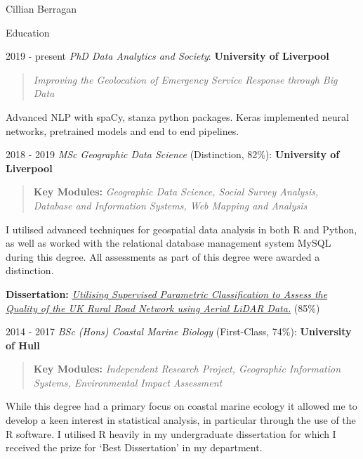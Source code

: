 \documentclass{scrartcl}
\begin{document}
\begin{cv}{Cillian Berragan}
\newpage
\begin{cvlist}{Education}

\item[2019 - present] \normalsize\textit{PhD Data Analytics and Society}: \textbf{University of Liverpool}

    \begin{quote}
        \small \textit{Improving the Geolocation of Emergency Service Response through Big Data}
    \end{quote}

    \small Advanced NLP with spaCy, stanza python packages. Keras implemented neural networks, pretrained models and end to end pipelines.

\item[2018 - 2019] \normalsize\textit{MSc Geographic Data Science} (Distinction, 82\%): \textbf{University of Liverpool}

    \begin{quote}
        \small\textbf{Key Modules: }\textit{Geographic Data Science, Social Survey Analysis, Database and Information Systems, Web Mapping and Analysis}
    \end{quote}

    \small I utilised advanced techniques for geospatial data analysis in both R and Python, as well as worked with the relational database management system MySQL during this degree. All assessments as part of this degree were awarded a distinction.

        \textbf{Dissertation:} \textit{\href{https://github.com/cjber/dissertation/blob/master/201374125.pdf}{Utilising Supervised Parametric Classification to Assess the Quality of the UK Rural Road Network using Aerial LiDAR Data.}} (85\%)
    \item[2014 - 2017] \normalsize\textit{BSc (Hons) Coastal Marine Biology} (First-Class, 74\%): \textbf{University of Hull}

    \begin{quote}
        \small \textbf{Key Modules:} \textit{Independent Research Project, Geographic Information Systems, Environmental Impact Assessment}
    \end{quote}

    \small While this degree had a primary focus on coastal marine ecology it allowed me to develop a keen interest in statistical analysis, in particular through the use of the R software. I utilised R heavily in my undergraduate dissertation for which I received the prize for ‘Best Dissertation’ in my department.


\end{cvlist}
\end{cv}
\end{document}
